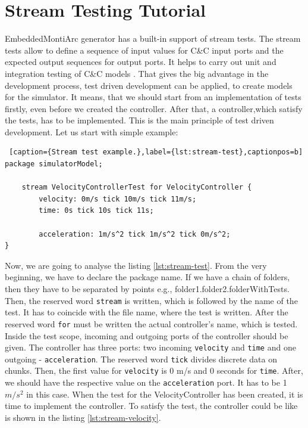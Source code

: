 \section{Stream Testing Tutorial}
EmbeddedMontiArc generator has a built-in support of stream tests. The stream tests allow to define a sequence of input values for C\&C input ports and the expected output sequences for output ports. It helps to carry out
unit and integration testing of C\&C models \cite{KRB96}. That gives the big advantage in the development process, test driven development \cite{TDD, beck2003test} can be applied, to create models for the simulator. It means, that we should start from an implementation of tests firstly, even before we created the controller. After that, a controller,which satisfy the tests, has to be implemented. This is the main principle of test driven development. Let us start with simple example:
\bigskip
\begin{lstlisting} [caption={Stream test example.},label={lst:stream-test},captionpos=b]
package simulatorModel;

    stream VelocityControllerTest for VelocityController {
        velocity: 0m/s tick 10m/s tick 11m/s;
        time: 0s tick 10s tick 11s;

        acceleration: 1m/s^2 tick 1m/s^2 tick 0m/s^2;
}
\end{lstlisting}
\bigskip
Now, we are going to analyse the listing \ref{lst:stream-test}. From the very beginning, we have to declare the package name. If we have a chain of folders, then they have to be separated by points e.g., folder1.folder2.folderWithTests. Then, the reserved word \texttt{stream} is written, which is followed by the name of the test. It has to coincide with the file name, where the test is written. After the reserved word \texttt{for} must be written the actual controller's name, which is tested. Inside the test scope, incoming and outgoing ports of the controller should be given. The controller has three ports: two incoming \texttt{velocity} and \texttt{time} and one outgoing - \texttt{acceleration}. The reserved word \texttt{tick} divides discrete data on chunks. Then, the first value for \texttt{velocity} is 0 m/s and 0 seconds for \texttt{time}. After, we should have the respective value on the \texttt{acceleration} port. It has to be 1 $m/s^2$ in this case.\newline
When the test for the VelocityController has been created, it is time to implement the controller. To satisfy the test, the controller could be like is shown in the listing \ref{lst:stream-velocity}.
